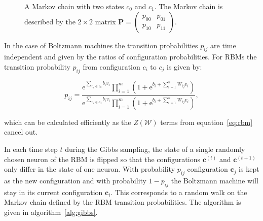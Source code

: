 \begin{figure}[H]
    \label{fig:markov}
    \centering
    \caption[A Markov chain with two states]{A Markov chain with two states $c_0$ and $c_1$. The Markov chain is 
described by the $2 \times 2$ matrix $\bm{P}=\begin{pmatrix} p_{00} & p_{01} \\ p_{10} & p_{11} \end{pmatrix}$.}
\end{figure}

In the case of Boltzmann machines the transition probabilities $p_{ij}$ are time independent and 
given by the ratios of configuration probabilities. For RBMs the transition probability $p_{ij}$ 
from configuration $c_i$ to $c_j$ is given by:

\begin{equation}
    p_{ij} = \frac{\mathrm{e}^{\sum_{v_i \in \bm{c_i}}b_iv_i}\prod_{i=1}^m(1+\mathrm{e}^{b_i + \sum_{i=1}^nW_{ij}v_i})}{\mathrm{e}^{\sum_{v_i \in \bm{c_j}}b_iv_i}\prod_{i=1}^m(1+\mathrm{e}^{b_i + \sum_{i=1}^nW_{ij}v_i})},
\end{equation}

which can be calculated efficiently as the $Z(\mathcal{W})$ terms from equation~\ref{eq:rbm} cancel out.

In each time step $t$ during the Gibbs sampling, the state of a single randomly chosen neuron of the RBM is flipped
so that the configurations $\bm{c}^{(t)}$ and $\bm{c}^{(t+1)}$ only differ in the state of one neuron. With 
probability $p_{ij}$ configuration $\bm{c}_j$ is kept as the new configuration and with probability
$1-p_{ij}$ the Boltzmann machine will stay in its current configuration $\bm{c}_i$. This corresponds to a random walk on the Markov chain defined by the RBM transition probabilities. The algorithm is given in 
algorithm~\ref{alg:gibbs}.

